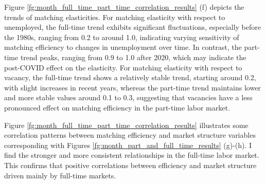 \documentclass[12pt]{article}
\begin{document}
Figure \ref{fg:month_full_time_part_time_correlation_results} (f) depicts the trends of matching elasticities.
For matching elasticity with respect to unemployed, the full-time trend exhibits significant fluctuations, especially before the 1980s, ranging from 0.2 to around 1.0, indicating varying sensitivity of matching efficiency to changes in unemployment over time. 
In contrast, the part-time trend peaks, ranging from 0.9 to 1.0 after 2020, which may indicate the post-COVID effect on the elasticity.
For matching elasticity with respect to vacancy, the full-time trend shows a relatively stable trend, starting around 0.2, with slight increases in recent years, whereas the part-time trend maintains lower and more stable values around 0.1 to 0.3, suggesting that vacancies have a less pronounced effect on matching efficiency in the part-time labor market.

Figure \ref{fg:month_full_time_part_time_correlation_results} illustrates some correlation patterns between matching efficiency and market structure variables corresponding with Figures \ref{fg:month_part_and_full_time_results} (g)-(h).
I find the stronger and more consistent relationships in the full-time labor market.
This confirms that positive correlations between efficiency and market structure driven mainly by full-time markets.
\end{document}
